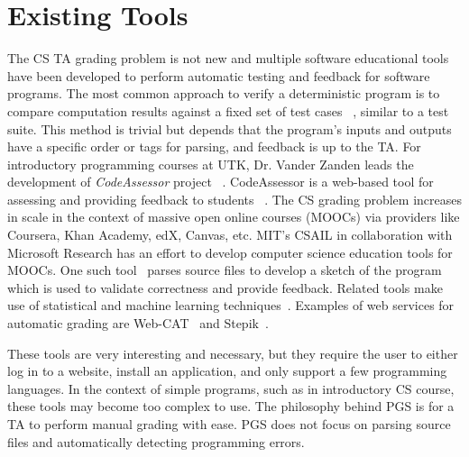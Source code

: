 \section{Existing Tools}
\label{sec:litreview}

\tab The CS TA grading problem is not new and multiple software educational tools
have been developed to perform automatic testing and feedback for software programs.
The most common approach to verify a deterministic program is to compare
computation results against a fixed set of test cases
~\cite{gao2015auto,gao2016automated}, similar to a test suite.
This method is trivial but depends that the program's inputs
and outputs have a specific order or tags for parsing, and feedback is up to the TA.
For introductory programming courses at UTK,
Dr. Vander Zanden leads the development of
\textit{CodeAssessor} project ~\cite{zandenUTKcodeassessor,zanden2012codeassessor}.
CodeAssessor is a web-based tool for assessing and providing feedback to
students ~\cite{vander2013improving}.
The CS grading problem increases in scale in the context of
massive open online courses (MOOCs) via providers
like Coursera, Khan Academy, edX, Canvas, etc.
MIT's CSAIL in collaboration with Microsoft Research has an effort to develop
computer science education tools for MOOCs.
One such tool~\cite{singh2013automated} parses source files to develop a
sketch of the program which is used to validate correctness and provide feedback.
Related tools make use of statistical and
machine learning techniques~\cite{antonucci2015incremental,srikant2014}.
Examples of web services for automatic grading are
Web-CAT~\cite{webcat} and Stepik~\cite{stepik}. \par

\tab These tools are very interesting and necessary, but they require
the user to either log in to a website, install an application, and only
support a few programming languages.
In the context of simple programs, such as in introductory CS course, these
tools may become too complex to use.
The philosophy behind PGS is for a TA to perform manual grading with ease.
PGS does not focus on parsing source files and automatically detecting programming errors. 

